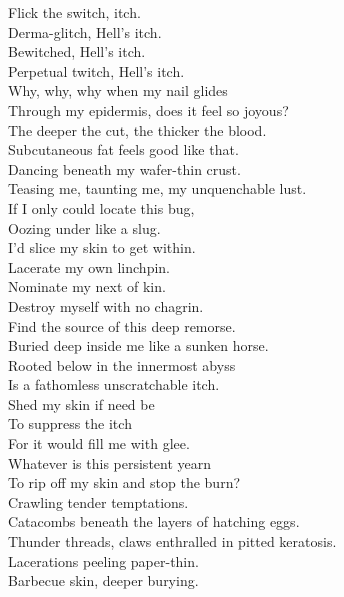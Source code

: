 
Flick the switch,  itch. \\
Derma-glitch, Hell's itch. \\
Bewitched, Hell's itch. \\
Perpetual twitch, Hell's itch. \\

Why, why, why when my nail glides \\
Through my epidermis, does it feel so joyous? \\
The deeper the cut, the thicker the blood. \\
Subcutaneous fat feels good like that. \\

Dancing beneath my wafer-thin crust. \\
Teasing me, taunting me, my unquenchable lust. \\
If I only could locate this bug, \\
Oozing under like a slug. \\

I'd slice my skin to get within. \\
Lacerate my own linchpin. \\
Nominate my next of kin. \\
Destroy myself with no chagrin. \\

Find the source of this deep remorse. \\
Buried deep inside me like a sunken horse. \\
Rooted below in the innermost abyss \\
Is a fathomless unscratchable itch. \\

Shed my skin if need be \\
To suppress the itch \\
For it would fill me with glee. \\
Whatever is this persistent yearn \\
To rip off my skin and stop the burn? \\

Crawling tender temptations. \\
Catacombs beneath the layers of hatching eggs. \\
Thunder threads, claws enthralled in pitted keratosis. \\
Lacerations peeling paper-thin. \\
Barbecue skin, deeper burying. \\

